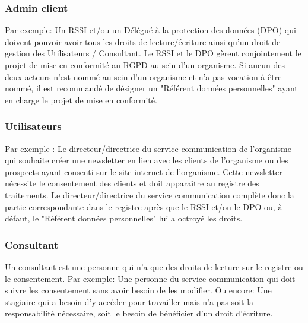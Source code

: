 \documentclass[12pt, a4paper]{report}
\begin{document}
    \subsubsection{Admin client}
        Par exemple: Un RSSI et/ou un Délégué à la protection des données (DPO) qui doivent pouvoir avoir tous les droits de lecture/écriture ainsi qu'un droit de gestion des Utilisateurs / Consultant.\newline
        Le RSSI et le DPO gèrent conjointement le projet de mise en conformité au RGPD au sein d'un organisme.\newline
        Si aucun des deux acteurs n'est nommé au sein d'un organisme et n'a pas vocation à être nommé, il est recommandé de désigner un "Référent données personnelles" ayant en charge le projet de mise en conformité.
    \newpage
    \subsubsection{Utilisateurs}
        Par exemple : Le directeur/directrice du service communication de l'organisme qui souhaite créer une newsletter en lien avec les clients de l'organisme ou des prospects ayant consenti sur le site internet de l'organisme.\newline
        Cette newsletter nécessite le consentement des clients et doit apparaître au registre des traitements.\newline
        Le directeur/directrice du service communication complète donc la partie correspondante dans le registre après que le RSSI et/ou le DPO ou, à défaut, le "Référent données personnelles" lui a octroyé les droits.
    \subsubsection{Consultant}
        Un consultant est une personne qui n'a que des droits de lecture sur le registre ou le consentement.\newline
        Par exemple: Une personne du service communication qui doit suivre les consentement sans avoir besoin de les modifier.\newline
        Ou encore: Une stagiaire qui a besoin d'y accéder pour travailler mais n'a pas soit la responsabilité nécessaire, soit le besoin de bénéficier d'un droit d'écriture.\newline
\makeutbmbackcover{}
\end{document}

